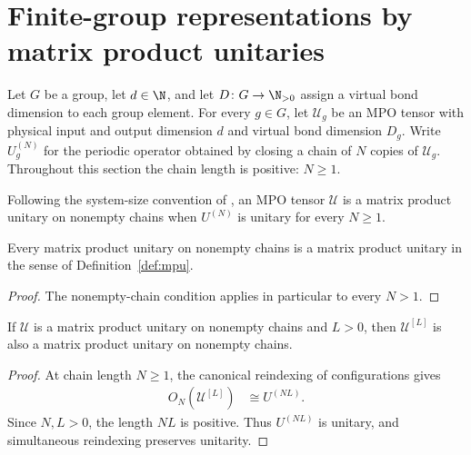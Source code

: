 \section{Finite-group representations by matrix product unitaries}
\label{sec:mpug_group_representations}

Let $G$ be a group, let $d\in\N$, and let
$D\colon G\to\N_{>0}$ assign a virtual bond dimension to each group element.
For every $g\in G$, let $\mathcal U_g$ be an MPO tensor with physical input and
output dimension $d$ and virtual bond dimension $D_g$. Write $U_g^{(N)}$ for
the periodic operator obtained by closing a chain of $N$ copies of
$\mathcal U_g$. Throughout this section the chain length is positive: $N\geq1$.

\begin{definition}
    \label{def:mpug_positive_mpu}
    \leanok
    Following the system-size convention of
    \cite[line~207]{FrancoRubio2025MPUGauging}, an MPO tensor $\mathcal U$ is a
    matrix product unitary on nonempty chains when $U^{(N)}$ is unitary for
    every $N\geq1$.
\end{definition}

\begin{lemma}
    \label{thm:mpug_positive_mpu_to_mpu}
    \leanok
    Every matrix product unitary on nonempty chains is a matrix product unitary
    in the sense of Definition~\ref{def:mpu}.
\end{lemma}

\begin{proof}\leanok
    The nonempty-chain condition applies in particular to every $N>1$.
\end{proof}

\begin{lemma}
    \label{thm:mpug_positive_mpu_blocking}
    \leanok
    If $\mathcal U$ is a matrix product unitary on nonempty chains and $L>0$,
    then $\mathcal U^{[L]}$ is also a matrix product unitary on nonempty chains.
\end{lemma}

\begin{proof}\leanok
    At chain length $N\geq1$, the canonical reindexing of configurations gives
    \begin{align}
        O_N(\mathcal U^{[L]}) & \cong U^{(NL)}.
    \end{align}
    Since $N,L>0$, the length $NL$ is positive. Thus $U^{(NL)}$ is unitary,
    and simultaneous reindexing preserves unitarity.
\end{proof}

